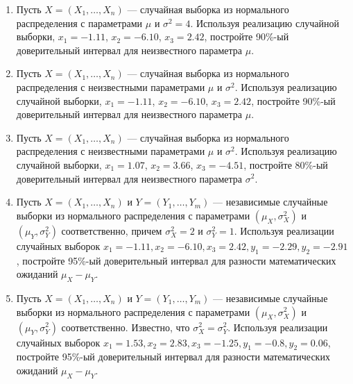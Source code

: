 \begin{enumerate}

\item Пусть $X = (X_{1}, \ldots, X_{n})$  — случайная выборка из нормального
распределения с параметрами $\mu$ и ${\sigma}^2 = 4$. Используя реализацию случайной выборки,
$x_{1} = -1.11$, $x_{2} = -6.10$, $x_{3} =  2.42$,
постройте 90\%-ый доверительный интервал для неизвестного параметра $\mu$.

\item Пусть $X = (X_{1}, \ldots, X_{n})$ — случайная выборка
из нормального распределения с неизвестными параметрами $\mu$ и ${\sigma}^2$.
Используя реализацию случайной выборки, $x_{1} = -1.11$, $x_{2} = -6.10$, $x_{3} = 2.42$,
постройте 90\%-ый доверительный интервал для неизвестного параметра $\mu$.

\item Пусть $X = (X_{1}, \ldots, X_{n})$ — случайная выборка из нормального распределения
с неизвестными параметрами $\mu$ и ${\sigma}^2$. Используя реализацию случайной выборки,
$x_{1} = 1.07$, $x_{2} = 3.66$, $x_{3} = -4.51$,
постройте 80\%-ый доверительный интервал для неизвестного параметра ${\sigma}^2$.

\item Пусть $X = (X_{1}, \ldots, X_{n})$ и $Y = (Y_{1}, \ldots, Y_{m})$ —
независимые случайные выборки из нормального распределения с параметрами $(\mu_{X},{\sigma^2_{X}})$ и $(\mu_{Y},{\sigma^2_{Y}})$ соответственно,
причем $\sigma^2_{X} = 2$ и $\sigma^2_{Y} = 1$. Используя реализации случайных выборок\newline
\hspace*{3cm}$x_{1} = -1.11, x_{2} = -6.10, x_{3} = 2.42, y_{1} = -2.29, y_{2} = -2.91$,\newline
постройте 95\%-ый доверительный интервал для разности математических ожиданий $\mu_{X} - \mu_{Y}$.

\item Пусть $X = (X_{1}, \ldots, X_{n})$ и $Y = (Y_{1}, \ldots, Y_{m})$ —
независимые случайные выборки из нормального распределения с параметрами $(\mu_{X},{\sigma^2_{X}})$ и $(\mu_{Y},{\sigma^2_{Y}})$ соответственно.
Известно, что $\sigma^2_{X} = \sigma^2_{Y}$. Используя реализации случайных выборок\newline
\hspace*{3cm}$x_{1} = 1.53, x_{2} = 2.83, x_{3} = -1.25, y_{1} = -0.8, y_{2} = 0.06$,\newline
постройте 95\%-ый доверительный интервал для разности математических ожиданий $\mu_{X} - \mu_{Y}$.


\end{enumerate}

